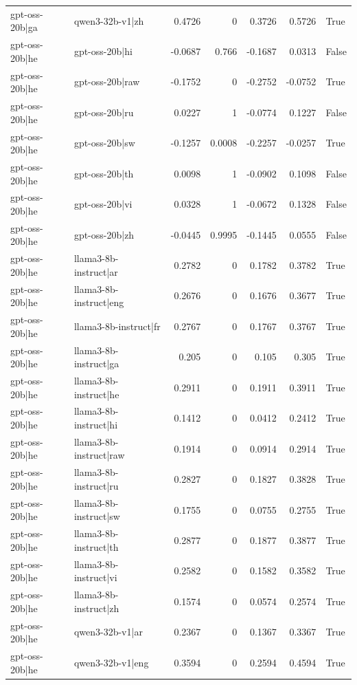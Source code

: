 \begin{table}
\begin{tabular}{l l r r r r l}
gpt-oss-20b|ga & qwen3-32b-v1|zh & 0.4726 & 0 & 0.3726 & 0.5726 & True \\
gpt-oss-20b|he & gpt-oss-20b|hi & -0.0687 & 0.766 & -0.1687 & 0.0313 & False \\
gpt-oss-20b|he & gpt-oss-20b|raw & -0.1752 & 0 & -0.2752 & -0.0752 & True \\
gpt-oss-20b|he & gpt-oss-20b|ru & 0.0227 & 1 & -0.0774 & 0.1227 & False \\
gpt-oss-20b|he & gpt-oss-20b|sw & -0.1257 & 0.0008 & -0.2257 & -0.0257 & True \\
gpt-oss-20b|he & gpt-oss-20b|th & 0.0098 & 1 & -0.0902 & 0.1098 & False \\
gpt-oss-20b|he & gpt-oss-20b|vi & 0.0328 & 1 & -0.0672 & 0.1328 & False \\
gpt-oss-20b|he & gpt-oss-20b|zh & -0.0445 & 0.9995 & -0.1445 & 0.0555 & False \\
gpt-oss-20b|he & llama3-8b-instruct|ar & 0.2782 & 0 & 0.1782 & 0.3782 & True \\
gpt-oss-20b|he & llama3-8b-instruct|eng & 0.2676 & 0 & 0.1676 & 0.3677 & True \\
gpt-oss-20b|he & llama3-8b-instruct|fr & 0.2767 & 0 & 0.1767 & 0.3767 & True \\
gpt-oss-20b|he & llama3-8b-instruct|ga & 0.205 & 0 & 0.105 & 0.305 & True \\
gpt-oss-20b|he & llama3-8b-instruct|he & 0.2911 & 0 & 0.1911 & 0.3911 & True \\
gpt-oss-20b|he & llama3-8b-instruct|hi & 0.1412 & 0 & 0.0412 & 0.2412 & True \\
gpt-oss-20b|he & llama3-8b-instruct|raw & 0.1914 & 0 & 0.0914 & 0.2914 & True \\
gpt-oss-20b|he & llama3-8b-instruct|ru & 0.2827 & 0 & 0.1827 & 0.3828 & True \\
gpt-oss-20b|he & llama3-8b-instruct|sw & 0.1755 & 0 & 0.0755 & 0.2755 & True \\
gpt-oss-20b|he & llama3-8b-instruct|th & 0.2877 & 0 & 0.1877 & 0.3877 & True \\
gpt-oss-20b|he & llama3-8b-instruct|vi & 0.2582 & 0 & 0.1582 & 0.3582 & True \\
gpt-oss-20b|he & llama3-8b-instruct|zh & 0.1574 & 0 & 0.0574 & 0.2574 & True \\
gpt-oss-20b|he & qwen3-32b-v1|ar & 0.2367 & 0 & 0.1367 & 0.3367 & True \\
gpt-oss-20b|he & qwen3-32b-v1|eng & 0.3594 & 0 & 0.2594 & 0.4594 & True \\

\end{tabular}
\end{table}
